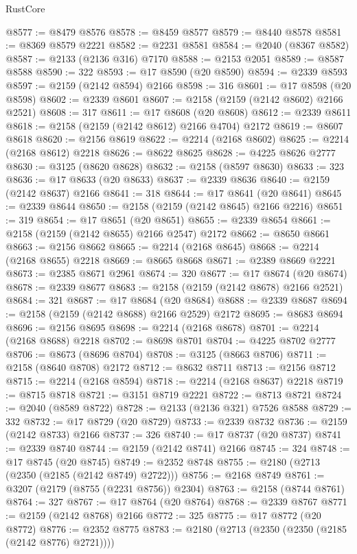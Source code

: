 \begin{lexlean}{RustCore}
\begin{coremodule}
@8577 := @8479 @8576
@8578 := @8459 @8577
@8579 := @8440 @8578
@8581 := @8369 @8579 @2221
@8582 := @2231 @8581
@8584 := @2040 (@8367 @8582)
@8587 := @2133 (@2136 @316) @7170
@8588 := @2153 @2051
@8589 := @8587 @8588
@8590 := 322
@8593 := @17 @8590 (@20 @8590)
@8594 := @2339 @8593
@8597 := @2159 (@2142 @8594) @2166
@8598 := 316
@8601 := @17 @8598 (@20 @8598)
@8602 := @2339 @8601
@8607 := @2158 (@2159 (@2142 @8602) @2166 @2521)
@8608 := 317
@8611 := @17 @8608 (@20 @8608)
@8612 := @2339 @8611
@8618 := @2158 (@2159 (@2142 @8612) @2166 @4704) @2172
@8619 := @8607 @8618
@8620 := @2156 @8619
@8622 := @2214 (@2168 @8602)
@8625 := @2214 (@2168 @8612) @2218
@8626 := @8622 @8625
@8628 := @4225 @8626 @2777
@8630 := @3125 (@8620 @8628)
@8632 := @2158 (@8597 @8630)
@8633 := 323
@8636 := @17 @8633 (@20 @8633)
@8637 := @2339 @8636
@8640 := @2159 (@2142 @8637) @2166
@8641 := 318
@8644 := @17 @8641 (@20 @8641)
@8645 := @2339 @8644
@8650 := @2158 (@2159 (@2142 @8645) @2166 @2216)
@8651 := 319
@8654 := @17 @8651 (@20 @8651)
@8655 := @2339 @8654
@8661 := @2158 (@2159 (@2142 @8655) @2166 @2547) @2172
@8662 := @8650 @8661
@8663 := @2156 @8662
@8665 := @2214 (@2168 @8645)
@8668 := @2214 (@2168 @8655) @2218
@8669 := @8665 @8668
@8671 := @2389 @8669 @2221
@8673 := @2385 @8671 @2961
@8674 := 320
@8677 := @17 @8674 (@20 @8674)
@8678 := @2339 @8677
@8683 := @2158 (@2159 (@2142 @8678) @2166 @2521)
@8684 := 321
@8687 := @17 @8684 (@20 @8684)
@8688 := @2339 @8687
@8694 := @2158 (@2159 (@2142 @8688) @2166 @2529) @2172
@8695 := @8683 @8694
@8696 := @2156 @8695
@8698 := @2214 (@2168 @8678)
@8701 := @2214 (@2168 @8688) @2218
@8702 := @8698 @8701
@8704 := @4225 @8702 @2777
@8706 := @8673 (@8696 @8704)
@8708 := @3125 (@8663 @8706)
@8711 := @2158 (@8640 @8708) @2172
@8712 := @8632 @8711
@8713 := @2156 @8712
@8715 := @2214 (@2168 @8594)
@8718 := @2214 (@2168 @8637) @2218
@8719 := @8715 @8718
@8721 := @3151 @8719 @2221
@8722 := @8713 @8721
@8724 := @2040 (@8589 @8722)
@8728 := @2133 (@2136 @321) @7526 @8588
@8729 := 332
@8732 := @17 @8729 (@20 @8729)
@8733 := @2339 @8732
@8736 := @2159 (@2142 @8733) @2166
@8737 := 326
@8740 := @17 @8737 (@20 @8737)
@8741 := @2339 @8740
@8744 := @2159 (@2142 @8741) @2166
@8745 := 324
@8748 := @17 @8745 (@20 @8745)
@8749 := @2352 @8748
@8755 := @2180 (@2713 (@2350 (@2185 (@2142 @8749) @2722)))
@8756 := @2168 @8749
@8761 := @3207 (@2179 (@8755 (@2231 @8756)) @2304)
@8763 := @2158 (@8744 @8761)
@8764 := 327
@8767 := @17 @8764 (@20 @8764)
@8768 := @2339 @8767
@8771 := @2159 (@2142 @8768) @2166
@8772 := 325
@8775 := @17 @8772 (@20 @8772)
@8776 := @2352 @8775
@8783 := @2180 (@2713 (@2350 (@2350 (@2185 (@2142 @8776) @2721))))

\end{coremodule}
\end{lexlean}
